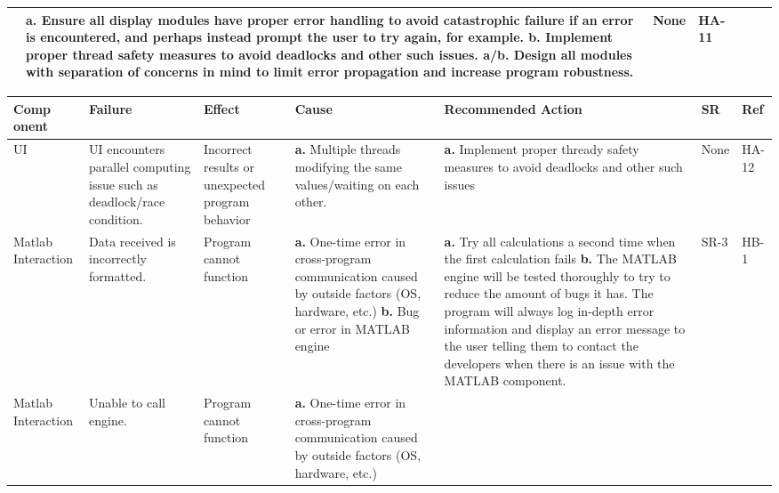 \documentclass{article}
\begin{document}
\begin{landscape}
\begin{table}[H]
\begin{tabular}{|p{} | p{} | p{} | p{} | p{} | p{} | p{}|}
      & \textbf{a.}  Ensure all display modules have proper error handling to avoid catastrophic failure if an error is encountered, 
        and perhaps instead prompt the user to try again, for example.\newline
        \textbf{b.} Implement proper thread safety measures to avoid deadlocks and other such issues.\newline
        \textbf{a/b.} Design all modules with separation of concerns in mind to limit error propagation and increase program robustness.
      &None&HA-11\\
    \bottomrule
      \end{tabular}
      \end{table}
      \pagebreak
    \begin{table}[H]
    \begin{tabular}{|p{} | p{} | p{} | p{} | p{} | p{} | p{}|}
        \toprule
        \textbf{Comp onent} & \textbf{Failure} & \textbf{Effect} & \textbf{Cause} & \textbf{Recommended Action} & \textbf{SR} & \textbf{Ref}\\
    \midrule
    UI& UI encounters parallel computing issue such as deadlock/race condition.
    & Incorrect results or unexpected program behavior
    & \textbf{a.} Multiple threads modifying the same values/waiting on each other.\newline
    & \textbf{a.} Implement proper thready safety measures to avoid deadlocks and other such issues
    &None & HA-12\\
    \midrule
    Matlab Interaction& Data received is incorrectly formatted.
    & Program cannot function
    & \textbf{a.} One-time error in cross-program communication caused by outside factors (OS, hardware, etc.)\newline
      \textbf{b.} Bug or error in MATLAB engine
    & \textbf{a.} Try all calculations a second time when the first calculation fails\newline
      \textbf{b.} The MATLAB engine will be tested thoroughly to try to reduce the amount of bugs it has. 
      The program will always log in-depth error information and display an error message to the user telling them to contact the developers when 
      there is an issue with the MATLAB component.     
    &SR-3 &HB-1\\
    \midrule
    Matlab Interaction& Unable to call engine.
      & Program cannot function
      & \textbf{a.} One-time error in cross-program communication caused by outside factors (OS, hardware, etc.)\newline

\end{tabular}
\end{table}
\end{landscape}
\end{document}
